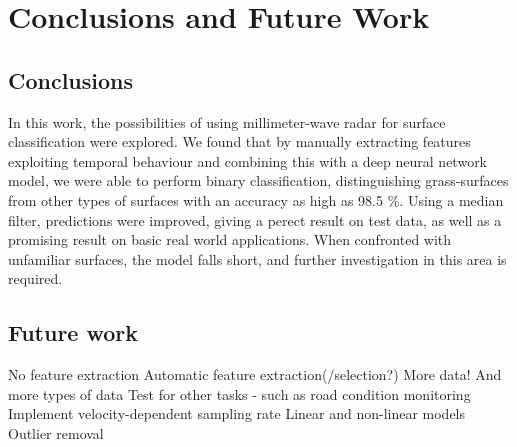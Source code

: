 \chapter{Conclusions and Future Work}

\section{Conclusions}
In this work, the possibilities of using millimeter-wave radar for surface classification were explored. We found that by manually extracting features exploiting temporal behaviour and combining this with a deep neural network model, we were able to perform binary classification, distinguishing grass-surfaces from other types of surfaces with an accuracy as high as 98.5 \%. Using a median filter, predictions were improved, giving a perect result on test data, as well as a promising result on basic real world applications. When confronted with unfamiliar surfaces, the model falls short, and further investigation in this area is required. 


\section{Future work}

	No feature extraction
	Automatic feature extraction(/selection?)
	More data! And more types of data
	Test for other tasks - such as road condition monitoring
	Implement velocity-dependent sampling rate
	Linear and non-linear models
	Outlier removal
